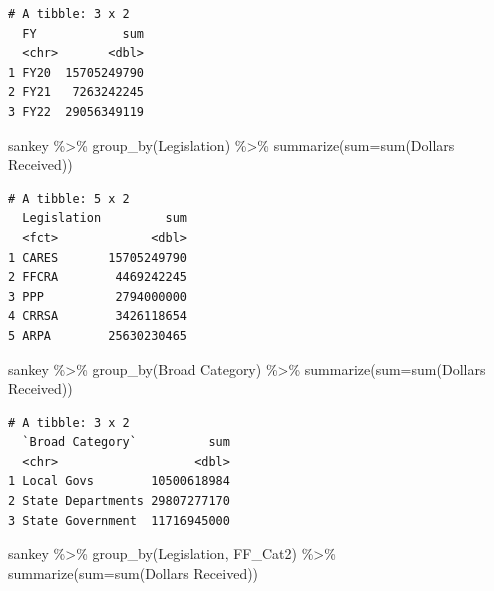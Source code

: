 \documentclass[
  letterpaper,
  DIV=11,
  numbers=noendperiod]{scrreport}
\newenvironment{Shaded}{\begin{snugshade}}{\end{snugshade}}
\newcommand{\AttributeTok}[1]{\textcolor[rgb]{0.40,0.45,0.13}{#1}}
\newcommand{\FunctionTok}[1]{\textcolor[rgb]{0.28,0.35,0.67}{#1}}
\newcommand{\NormalTok}[1]{\textcolor[rgb]{0.00,0.23,0.31}{#1}}
\newcommand{\SpecialCharTok}[1]{\textcolor[rgb]{0.37,0.37,0.37}{#1}}
\newcommand{\StringTok}[1]{\textcolor[rgb]{0.13,0.47,0.30}{#1}}
\begin{document}
\begin{verbatim}
# A tibble: 3 x 2
  FY            sum
  <chr>       <dbl>
1 FY20  15705249790
2 FY21   7263242245
3 FY22  29056349119
\end{verbatim}

\begin{Shaded}
\begin{Highlighting}[]
\NormalTok{sankey }\SpecialCharTok{\%\textgreater{}\%} 
  \FunctionTok{group\_by}\NormalTok{(Legislation) }\SpecialCharTok{\%\textgreater{}\%} 
  \FunctionTok{summarize}\NormalTok{(}\AttributeTok{sum=}\FunctionTok{sum}\NormalTok{(}\StringTok{\textasciigrave{}}\AttributeTok{Dollars Received}\StringTok{\textasciigrave{}}\NormalTok{))}
\end{Highlighting}
\end{Shaded}

\begin{verbatim}
# A tibble: 5 x 2
  Legislation         sum
  <fct>             <dbl>
1 CARES       15705249790
2 FFCRA        4469242245
3 PPP          2794000000
4 CRRSA        3426118654
5 ARPA        25630230465
\end{verbatim}

\begin{Shaded}
\begin{Highlighting}[]
\NormalTok{sankey }\SpecialCharTok{\%\textgreater{}\%} 
  \FunctionTok{group\_by}\NormalTok{(}\StringTok{\textasciigrave{}}\AttributeTok{Broad Category}\StringTok{\textasciigrave{}}\NormalTok{) }\SpecialCharTok{\%\textgreater{}\%} 
  \FunctionTok{summarize}\NormalTok{(}\AttributeTok{sum=}\FunctionTok{sum}\NormalTok{(}\StringTok{\textasciigrave{}}\AttributeTok{Dollars Received}\StringTok{\textasciigrave{}}\NormalTok{))}
\end{Highlighting}
\end{Shaded}

\begin{verbatim}
# A tibble: 3 x 2
  `Broad Category`          sum
  <chr>                   <dbl>
1 Local Govs        10500618984
2 State Departments 29807277170
3 State Government  11716945000
\end{verbatim}

\begin{Shaded}
\begin{Highlighting}[]
\NormalTok{sankey }\SpecialCharTok{\%\textgreater{}\%} 
  \FunctionTok{group\_by}\NormalTok{(Legislation, FF\_Cat2) }\SpecialCharTok{\%\textgreater{}\%} 
  \FunctionTok{summarize}\NormalTok{(}\AttributeTok{sum=}\FunctionTok{sum}\NormalTok{(}\StringTok{\textasciigrave{}}\AttributeTok{Dollars Received}\StringTok{\textasciigrave{}}\NormalTok{))}
\end{Highlighting}
\end{Shaded}
\end{document}

